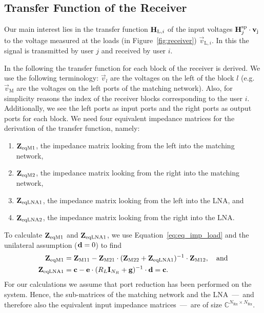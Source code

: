 \subsection{Transfer Function of the Receiver}
\label{sec:transf}
Our main interest lies in the transfer function $\mathbf{H}_{\text{L},i}$ of the input voltages $\mathbf{H}_j^{\text{sp}}\cdot\mathbf{v}_\text{j}$ to the voltage measured at the loads (in Figure~\ref{fig:receiver}) $\vec{v}_{\text{L},i}$.
In this the signal is transmitted by user $j$ and received by user $i$.

In the following the transfer function for each block of the receiver is derived.
We use the following terminology: $\vec{v}_l$ are the voltages on the left of the block $l$ (e.g. $\vec{v}_\text{M}$ are the voltages on the left ports of the matching network).
Also, for simplicity reasons the index of the receiver blocks corresponding to the user $i$.
Additionally, we see the left ports as input ports and the right ports as output ports for each block.
We need four equivalent impedance matrices for the derivation of the transfer function, namely:
\begin{enumerate}
\item{$\mathbf{Z}_\text{eqM1}$, the impedance matrix looking from the left into the matching network,}
\item{$\mathbf{Z}_\text{eqM2}$, the impedance matrix looking from the right into the matching network,}
\item{$\mathbf{Z}_\text{eqLNA1}$, the impedance matrix looking from the left into the LNA, and}
\item{$\mathbf{Z}_\text{eqLNA2}$, the impedance matrix looking from the right into the LNA.}
\end{enumerate}

To calculate $\mathbf{Z}_\text{eqM1}$ and $\mathbf{Z}_\text{eqLNA1}$, we use Equation~\eqref{eq:eq_imp_load} and the unilateral assumption ($\mathbf{d}=0$) to find
\begin{align}
\label{eq:zeqm1}
\mathbf{Z}_\text{eqM1} &= \mathbf{Z}_\text{M11} - \mathbf{Z}_\text{M21}\cdot(\mathbf{Z}_\text{M22} + \mathbf{Z}_\text{eqLNA1})^{-1}\cdot\mathbf{Z}_\text{M12},\quad\text{and}\\
\label{eq:zeqlna1}
\mathbf{Z}_\text{eqLNA1} &= \mathbf{c} - \mathbf{e}\cdot(R_L\mathbf{I}_{N_R} + \mathbf{g})^{-1}\cdot\mathbf{d} = \mathbf{c}.
\end{align}
For our calculations we assume that port reduction has been performed on the system.
Hence, the sub-matrices of the matching network and the LNA~---~and therefore also the equivalent input impedance matrices~---~are of size $\mathbb{C}^{N_\text{Rx}\times N_\text{Rx}}$.

